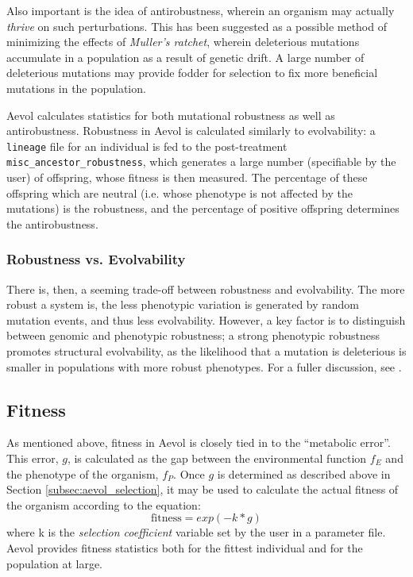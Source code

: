 Also important is the idea of antirobustness, wherein an organism may actually \textit{thrive} on such perturbations. This has been suggested as a possible method of minimizing the effects of \textit{Muller's ratchet}, wherein deleterious mutations accumulate in a population as a result of genetic drift\cite{Gordo2137}. A large number of deleterious mutations may provide fodder for selection to fix more beneficial mutations in the population\cite{doi:10.1186/s12862-019-1507-z}.

Aevol calculates statistics for both mutational robustness as well as antirobustness. Robustness in Aevol is calculated similarly to evolvability: a \texttt{lineage} file for an individual is fed to the post-treatment \texttt{misc\_ancestor\_robustness}, which generates a large number (specifiable by the user) of offspring, whose fitness is then measured. The percentage of these offspring which are neutral (i.e. whose phenotype is not affected by the mutations) is the robustness, and the percentage of positive offspring determines the antirobustness. 
\subsubsection{Robustness vs. Evolvability}
There is, then, a seeming trade-off between robustness and evolvability. The more robust a system is, the less phenotypic variation is generated by random mutation events, and thus less evolvability. However, a key factor is to distinguish between genomic and phenotypic robustness; a strong phenotypic robustness promotes structural evolvability, as the likelihood that a mutation is deleterious is smaller in populations with more robust phenotypes. For a fuller discussion, see \cite{doi:10.1098/rspb.2007.1137}.

\subsection{Fitness}\label{subsec:fitness}
As mentioned above, fitness in Aevol is closely tied in to the ``metabolic error''. This error, $g$, is calculated as the gap between the environmental function $f_E$ and the phenotype of the organism, $f_P$. Once $g$ is determined as described above in Section \ref{subsec:aevol_selection}, it may be used to calculate the actual fitness of the organism according to the equation:
\begin{equation*}
\text{fitness} = exp(-k*g)
\end{equation*} 
where k is the \textit{selection coefficient} variable set by the user in a parameter file. Aevol provides fitness statistics both for the fittest individual and for the population at large.

